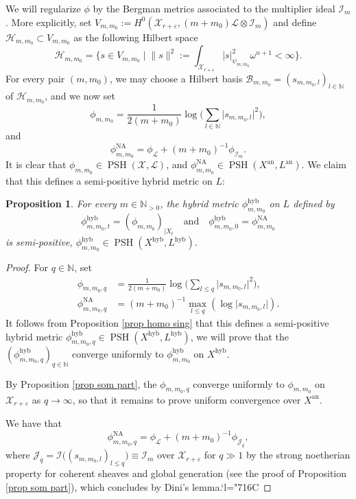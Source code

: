 \documentclass[JEP,XML,SOM,Unicode,published]{cedram}
\newcommand{\Changelback}{\mathcode`l="716C}
\let\ts\textstyle
\let\sep\mid
\newtheorem{prop}[equation]{Proposition}
\theoremstyle{definition}
\newcommand \N{\mathbb N}
\newcommand \Ld {\mathscr {L}}
\newcommand \X {\mathscr{X}}
\let\eps\varepsilon
\newcommand{\an}{\mathrm{an}}
\newcommand{\hyb}{\mathrm{hyb}}
\DeclareMathOperator{\NA}{NA}
\DeclareMathOperator{\PSH}{PSH}
\begin{document}
We will regularize $\phi$ by the Bergman metrics associated to the multiplier ideal $\mathscr{I}_m$. More explicitly, set $V_{m, m_0}:= H^0(\X_{r+\eps}, (m+m_0)\Ld \otimes \mathscr{I}_{m})$ and define $ \mathscr{H}_{m, m_0} \subset V_{m, m_0}$ as the following Hilbert space
\[
\mathscr{H}_{m, m_0} = \bigl\{ s \in V_{m, m_0} \sep \lVert s \rVert^2:= \ts\int_{\X_{r+\eps}} \lvert s \rvert^2_{\psi_{m, m_0}} \omega^{n+1} < \infty \bigr\}.
\]
For every pair $(m, m_0)$, we may choose a Hilbert basis $\mathscr{B}_{m, m_0} = (s_{m, m_0, l})_{l \in \N}$ of $ \mathscr{H}_{m, m_0}$, and we now set
\[
\phi_{m, m_0} = \frac{1}{2(m+m_0)} \log \bigl(\ts\sum_{l \in \N} \lvert s_{m, m_0, l} \rvert^2\bigr),
\]
and
\[
\phi^{\NA}_{m, m_0} =\phi_{\Ld}+ (m+m_0)^{-1} \phi_{\mathscr{I}_m}.
\]
It is clear that $\phi_{m, m_0} \in \PSH(\X, \Ld)$, and $\phi_{m, m_0}^{\NA} \in \PSH(X^{\an}, L^{\an})$. We claim that this defines a semi-positive hybrid metric on $L$:
\begin{prop} \label{prop sum psh}
For every $m \in \N_{>0}$, the hybrid metric $\phi^{\hyb}_{m, m_0}$ on $L$ defined by
\[
\phi^{\hyb}_{m, m_0, t} = (\phi_{m, m_0})_{| X_{t}}
\quad\text{and}\quad
\phi^{\hyb}_{m, m_0, 0} = \phi^{\NA}_{m, m_0}
\]
is semi-positive, \ie $\phi^{\hyb}_{m, m_0} \in \PSH(X^{\hyb}, L^{\hyb})$.
\end{prop}
\begin{proof}
For $q \in \N$, set
\begin{align*}
\phi_{m, m_0, q} &= \frac{1}{2(m+m_0)} \log \bigl(\ts\sum_{l \le q} \lvert s_{m, m_0, l} \rvert^2\bigr),
\\
\tag*{and}
\phi^{\NA}_{m, m_0, q} &=(m+m_0)^{-1} \max_{l \le q} (\log \lvert s_{m, m_0, l} \rvert).
\end{align*}
It follows from Proposition \ref{prop homo sing} that this defines a semi-positive hybrid metric $\phi^{\hyb}_{m, m_0, q} \in \PSH(X^{\hyb}, L^{\hyb})$, we will prove that the $(\phi^{\hyb}_{m, m_0, q})_{q \in \N}$ converge uniformly to $\phi^{\hyb}_{m, m_0}$ on $X^{\hyb}$.

By Proposition \ref{prop som part}, the $\phi_{m, m_0, q}$ converge uniformly to $\phi_{m, m_0}$ on $\X_{r+ \eps}$ as $q \to \infty$, so that it remains to prove uniform convergence over $X^{\an}$.

We have that
\[
\phi^{\NA}_{m, m_0, q} = \phi_{\Ld} + (m+m_0)^{-1} \phi_{\mathscr{J}_q},
\]
where $\mathscr{J}_q = \mathscr{I} \bigl((s_{m, m_0, l})_{l \le q} \bigr) \equiv \mathscr{I}_m$ over $\X_{r+\eps}$ for $q \gg 1$ by the strong noetherian property for coherent sheaves and global generation (see the proof of Proposition \ref{prop som part}), which concludes by Dini's lemma.\Changelback
\end{proof}
\end{document}
